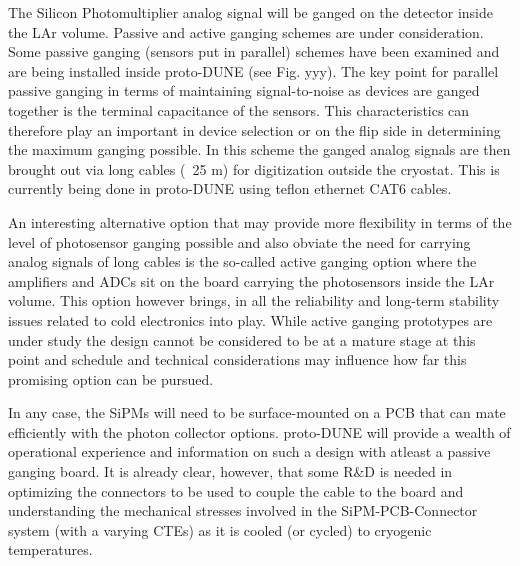 The Silicon Photomultiplier analog signal will be ganged on the detector inside the
LAr volume. Passive and active ganging schemes are under consideration. Some passive
ganging (sensors put in parallel) schemes have been examined and are being installed inside
proto-DUNE (see Fig. yyy). The key point for parallel passive ganging in terms of 
maintaining signal-to-noise as devices are ganged together is the terminal capacitance of the 
sensors. This characteristics can therefore play an important in device selection or on
the flip side in determining the maximum ganging possible. In this scheme the 
ganged analog signals are then brought out via long cables (~25 m) for digitization outside
the cryostat. This is currently being done in proto-DUNE using teflon ethernet CAT6 cables.

An interesting alternative option that may provide more flexibility in terms of the level of
photosensor ganging possible and also obviate the need for carrying analog signals of long cables
is the so-called active ganging option where the amplifiers and ADCs sit on the board carrying 
the photosensors inside the LAr volume. This option however brings, in all the reliability and long-term
stability issues related to cold electronics into play. While active ganging prototypes are under study 
the design cannot be considered to be at a mature stage at this point and schedule and technical
considerations may influence how far this promising option can be pursued.

In any case, the SiPMs will need to be surface-mounted on a PCB that can mate efficiently with the photon
collector options. proto-DUNE will provide a wealth of operational experience and information on
such a design with atleast a passive ganging board. It is already clear, however, that some R$\&$D is needed 
in optimizing the connectors to be used to couple the cable to the board and understanding the 
mechanical stresses involved in the SiPM-PCB-Connector system (with a varying CTEs) as it
is cooled (or cycled) to cryogenic temperatures.





